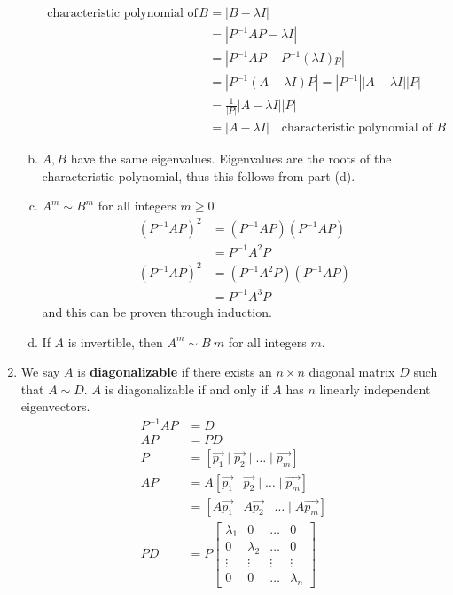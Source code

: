 \documentclass{math}
\begin{document}
\begin{enumerate}[{Theorem} 1:]
\begin{enumerate}[(a)]
    \begin{align*}
      \text{characteristic polynomial of } B &= |B-\lambda I| \\
      &= |P^{-1}AP-\lambda I| \\
      &= |P^{-1}AP-P^{-1}(\lambda I)p| \\
      &= |P^{-1}(A-\lambda I)P| = |P^{-1}||A-\lambda I||P| \\
      &= \frac{1}{|P|}|A-\lambda I||P| \\
      &= |A-\lambda I| \quad\text{characteristic polynomial of } B
    \end{align*}
    \item \( A,B \) have the same eigenvalues. Eigenvalues are the roots of the
    characteristic polynomial, thus this follows from part (d).
    \item \( A^m\sim B^m \) for all integers \( m \ge 0 \)
    \begin{align*}
      (P^{-1}AP)^2 &= (P^{-1}AP)(P^{-1}AP) \\
      &= P^{-1}A^2P \\
      (P^{-1}AP)^2 &= (P^{-1}A^2P)(P^{-1}AP) \\
      &= P^{-1}A^3P
    \end{align*}
    and this can be proven through induction.
    \item If \( A \) is invertible, then \( A^m\sim B~m \) for all integers
    \( m \).
  \end{enumerate}
  \item We say \( A \) is \textbf{diagonalizable} if there exists an
  \( n\times n \) diagonal matrix \( D \) such that \( A\sim D \). \( A \) is
  diagonalizable if and only if \( A \) has \( n \) linearly independent
  eigenvectors.
  \begin{align*}
    P^{-1}AP &= D \\
    AP &= PD \\
    P &= [\vec{p_1}\mid\vec{p_2}\mid\dots\mid\vec{p_m}] \\
    AP &= A[\vec{p_1}\mid\vec{p_2}\mid\dots\mid\vec{p_m}] \\
    &= [A\vec{p_1}\mid A\vec{p_2}\mid\dots\mid A\vec{p_m}] \\
    PD &= P\begin{bmatrix}
      \lambda_1 & 0 & \dots & 0 \\
      0 & \lambda_2 & \dots & 0 \\
      \vdots & \vdots & \vdots & \vdots \\
      0 & 0 & \dots & \lambda_n

\end{bmatrix}
\end{align*}
\end{enumerate}
\end{document}
